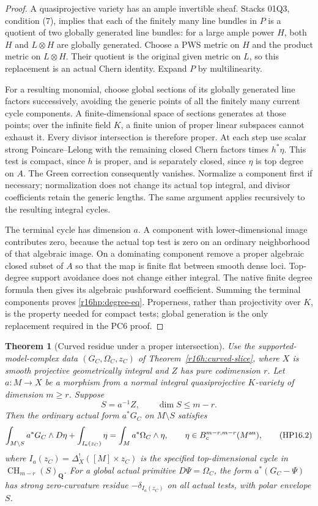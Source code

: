 \documentclass[11pt,a4paper]{article}
\newtheorem{theorem}{Theorem}[section]
\theoremstyle{definition}
\theoremstyle{remark}
\numberwithin{equation}{section}
\begin{document}
\begin{proof}
A quasiprojective variety has an ample invertible sheaf. Stacks 01Q3,
condition (7), implies that each of the finitely many line bundles in
$P$ is a quotient of two globally generated line bundles: for a large
ample power $H$, both $H$ and $L\otimes H$ are globally generated.
Choose a PWS metric on $H$ and the product metric on $L\otimes H$.
Their quotient is the original given metric on $L$, so this replacement
is an actual Chern identity. Expand $P$ by multilinearity.

For a resulting monomial, choose global sections of its globally
generated line factors successively, avoiding the generic points of
all the finitely many current cycle components. A finite-dimensional
space of sections generates at those points; over the infinite field
$K$, a finite union of proper linear subspaces cannot exhaust it.
Every divisor intersection is therefore proper. At each step use
scalar strong Poincare--Lelong with the remaining closed Chern factors
times $h^*\eta$. This test is compact, since $h$ is proper, and is
separately closed, since $\eta$ is top degree on $A$. The Green
correction consequently vanishes. Normalize a component first if
necessary; normalization does not change its actual top integral,
and divisor coefficients retain the generic lengths. The same argument
applies recursively to the resulting integral cycles.

The terminal cycle has dimension $a$. A component with lower-dimensional
image contributes zero, because the actual top test is zero on an
ordinary neighborhood of that algebraic image. On a dominating
component remove a proper algebraic closed subset of $A$ so that the
map is finite flat between smooth dense loci. Top-degree support
avoidance does not change either integral. The native finite degree
formula then gives its algebraic pushforward coefficient. Summing the
terminal components proves \eqref{r16hp:degree-eq}. Properness, rather
than projectivity over $K$, is the property needed for compact tests;
global generation is the only replacement required in the PC6 proof.
\end{proof}

\begin{theorem}[Curved residue under a proper intersection]
\label{r16hp:residue}
Use the supported-model-complex data $(G_C,\Omega_C,z_C)$ of
Theorem~\ref{r16h:curved-slice}, where $X$ is smooth projective
geometrically integral and $Z$ has pure codimension $r$. Let
$a:M\to X$ be a morphism from a normal integral quasiprojective
$K$-variety of dimension $m\geq r$. Suppose
\[
                   S=a^{-1}Z,\qquad \dim S\leq m-r.
\]
Then the ordinary actual form $a^*G_C$ on $M\setminus S$ satisfies
\[
 \int_{M\setminus S}a^*G_C\wedge D\eta
       +\int_{I_a(z_C)}\eta
       =\int_M a^*\Omega_C\wedge\eta,
 \qquad \eta\in B_c^{m-r,m-r}(M^{\rm an}),
 \tag{HP16.2}\label{r16hp:residue-eq}
\]
where $I_a(z_C)=\Delta_X^!([M]\times z_C)$ is the specified
top-dimensional cycle in $\operatorname{CH}_{m-r}(S)_{\mathbf Q}$.
For a global actual primitive $D\Psi=\Omega_C$, the form
$a^*(G_C-\Psi)$ has strong zero-curvature residue $-\delta_{I_a(z_C)}$
on all actual tests, with polar envelope $S$.
\end{theorem}
\end{document}
